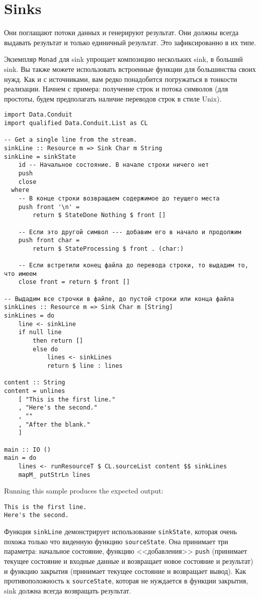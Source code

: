 \section{Sinks}

Они поглащают потоки данных и генерируют результат. Они должны всегда выдавать результат
и только единичный результат. Это зафиксированно в их типе.

Экземпляр \lstinline=Monad= для sink упрощает композицию нескольких sink, в больший sink.
Вы также
можете использовать встроенные функции для большинства своих нужд. Как и с источниками,
вам редко понадобится погружаться в тонкости реализации. Начнем с примера:
получение строк и потока символов (для простоты, будем предполагать наличие переводов
строк в стиле Unix).

\begin{lstlisting}
import Data.Conduit
import qualified Data.Conduit.List as CL

-- Get a single line from the stream.
sinkLine :: Resource m => Sink Char m String
sinkLine = sinkState
    id -- Начальное состояние. В начале строки ничего нет
    push
    close
  where
    -- В конце строки возвращаем содержимое до теущего места
    push front '\n' =
        return $ StateDone Nothing $ front []

    -- Если это другой символ --- добавим его в начало и продолжим
    push front char =
        return $ StateProcessing $ front . (char:)

    -- Если встретили конец файла до перевода строки, то выдадим то, что имеем
    close front = return $ front []

-- Выдадим все строчки в файле, до пустой строки или конца файла
sinkLines :: Resource m => Sink Char m [String]
sinkLines = do
    line <- sinkLine
    if null line
        then return []
        else do
            lines <- sinkLines
            return $ line : lines

content :: String
content = unlines
    [ "This is the first line."
    , "Here's the second."
    , ""
    , "After the blank."
    ]

main :: IO ()
main = do
    lines <- runResourceT $ CL.sourceList content $$ sinkLines
    mapM_ putStrLn lines
\end{lstlisting}
Running this sample produces the expected output:
\begin{verbatim}
This is the first line.
Here's the second.
\end{verbatim}

Функция \lstinline=sinkLine= демонстрирует использование \lstinline=sinkState=, которая
очень похожа только что
виденную функцию \lstinline=sourceState=. Она принимает три параметра: начальное
состояние,
функцию <<добавления>> \verb=push= 
(принимает текущее состояние и входные данные и возвращает новое состояние и результат)
и функцию закрытия (принимает текущее состояние и возвращает вывод). Как
противоположность к \lstinline=sourceState=, которая не нуждается в функции закрытия, sink
должна
всегда возвращать результат.

